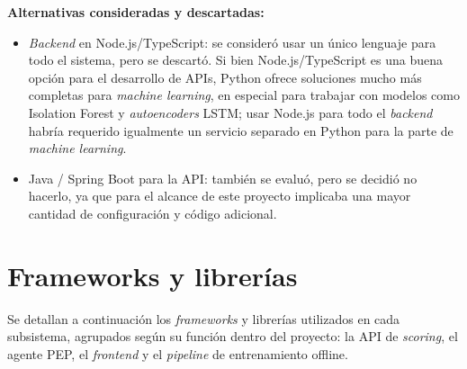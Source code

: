 \noindent\textbf{Alternativas consideradas y descartadas:}
\begin{itemize}
	\item \emph{Backend} en Node.js/TypeScript: se consideró usar un único lenguaje para todo el sistema, pero se descartó. Si bien Node.js/TypeScript es una buena opción para el desarrollo de APIs, Python ofrece soluciones mucho más completas para \emph{machine learning}, en especial para trabajar con modelos como Isolation Forest y \emph{autoencoders} LSTM; usar Node.js para todo el \emph{backend} habría requerido igualmente un servicio separado en Python para la parte de \emph{machine learning}.
	\item Java / Spring Boot para la API: también se evaluó, pero se decidió no hacerlo, ya que para el alcance de este proyecto implicaba una mayor cantidad de configuración y código adicional.
\end{itemize}

\section{Frameworks y librerías}
Se detallan a continuación los \emph{frameworks} y librerías utilizados en cada subsistema, agrupados según su función dentro del proyecto: la API de \emph{scoring}, el agente PEP, el \emph{frontend} y el \emph{pipeline} de entrenamiento offline.

